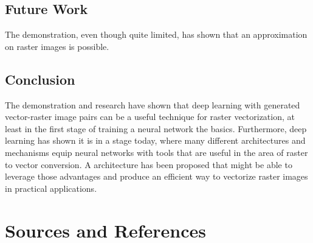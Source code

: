 \documentclass[12pt, a4paper, titlepage]{report}
\begin{document}
\section{Future Work}

The demonstration, even though quite limited, has shown that an approximation on raster images is possible.

\section{Conclusion}

The demonstration and research have shown that deep learning with generated vector-raster image pairs can be a useful technique for raster vectorization, at least in the first stage of training a neural network the basics.
Furthermore, deep learning has shown it is in a stage today, where many different architectures and mechanisms equip neural networks with tools that are useful in the area of raster to vector conversion. A architecture has been proposed that might be able to leverage those advantages and produce an efficient way to vectorize raster images in practical applications.





\chapter{Sources and References}

\nocite{*}

\begin{refcontext}[labelprefix=T]
   \printbibliography[type=misc, keyword={TextResource}, title={Text Sources and References}]
\end{refcontext}

\begin{refcontext}[labelprefix=I]
  \printbibliography[type=misc, keyword={ImageResource}, title={Image Resources}]
\end{refcontext}

\begin{refcontext}[labelprefix=A]
   \printbibliography[type=misc, keyword={AITool}, title={AI Tools}]
\end{refcontext}

\end{document}
